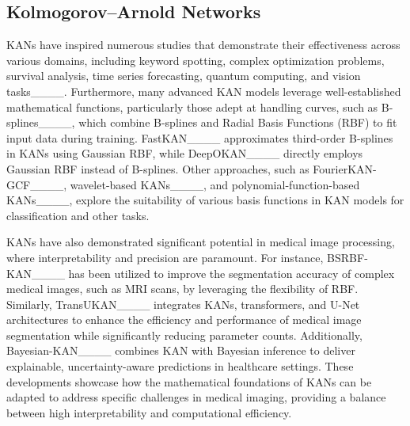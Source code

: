 \subsection{Kolmogorov–Arnold Networks}
KANs have inspired numerous studies that demonstrate their effectiveness across various domains, including keyword spotting, complex optimization problems, survival analysis, time series forecasting, quantum computing, and vision tasks____. Furthermore, many advanced KAN models leverage well-established mathematical functions, particularly those adept at handling curves, such as B-splines____, which combine B-splines and Radial Basis Functions (RBF) to fit input data during training. FastKAN____ approximates third-order B-splines in KANs using Gaussian RBF, while DeepOKAN____ directly employs Gaussian RBF instead of B-splines. Other approaches, such as FourierKAN-GCF____, wavelet-based KANs____, and polynomial-function-based KANs____, explore the suitability of various basis functions in KAN models for classification and other tasks.

KANs have also demonstrated significant potential in medical image processing, where interpretability and precision are paramount. For instance, BSRBF-KAN____ has been utilized to improve the segmentation accuracy of complex medical images, such as MRI scans, by leveraging the flexibility of RBF. Similarly, TransUKAN____ integrates KANs, transformers, and U-Net architectures to enhance the efficiency and performance of medical image segmentation while significantly reducing parameter counts. Additionally, Bayesian-KAN____ combines KAN with Bayesian inference to deliver explainable, uncertainty-aware predictions in healthcare settings. These developments showcase how the mathematical foundations of KANs can be adapted to address specific challenges in medical imaging, providing a balance between high interpretability and computational efficiency.
